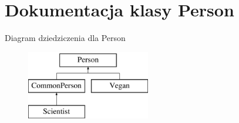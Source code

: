 \hypertarget{classPerson}{}\section{Dokumentacja klasy Person}
\label{classPerson}
Diagram dziedziczenia dla Person\begin{figure}[H]
\begin{center}
\leavevmode
\includegraphics[height=3.000000cm]{classPerson}
\end{center}
\end{figure}
